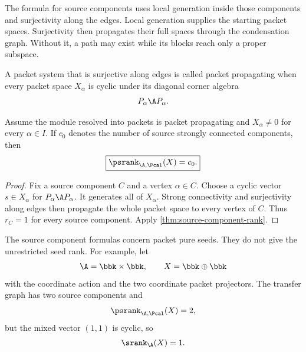 \begin{hypothesisguide}
The formula for source components uses local generation inside those components and surjectivity along the edges.  Local generation supplies the starting packet spaces.  Surjectivity then propagates their full spaces through the condensation graph.  Without it, a path may exist while its blocks reach only a proper subspace.
\end{hypothesisguide}


\begin{definition}
\label{def:packet-propagating}
A packet system that is surjective along edges is called packet propagating when every packet space $X_\alpha$ is cyclic under its diagonal corner algebra
\[
P_\alpha\A P_\alpha.
\]
\end{definition}

\begin{corollary}
\label{cor:source-component-count}
Assume the module resolved into packets is packet propagating and $X_\alpha\neq0$ for every $\alpha\in I$.  If $c_0$ denotes the number of source strongly connected components, then
\[
\boxed{
\psrank_{\A,\Pcal}(X)=c_0.
}
\]
\end{corollary}

\begin{proof}
Fix a source component $C$ and a vertex $\alpha\in C$.  Choose a cyclic vector $s\in X_\alpha$ for $P_\alpha\A P_\alpha$.  It generates all of $X_\alpha$.  Strong connectivity and surjectivity along edges then propagate the whole packet space to every vertex of $C$.  Thus $r_C=1$ for every source component.  Apply \cref{thm:source-component-rank}.
\end{proof}

\begin{boundary}
\label{bnd:packet-pure-boundary}
The source component formulas concern packet pure seeds.  They do not give the unrestricted seed rank.  For example, let
\[
\A=\bbk\times\bbk,
\qquad
X=\bbk\oplus\bbk
\]
with the coordinate action and the two coordinate packet projectors.  The transfer graph has two source components and
\[
\psrank_{\A,\Pcal}(X)=2,
\]
but the mixed vector $(1,1)$ is cyclic, so
\[
\srank_{\A}(X)=1.
\]
\end{boundary}

